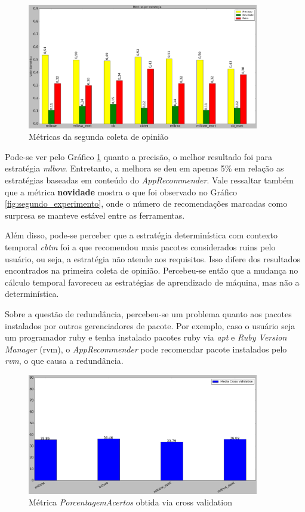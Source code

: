 \begin{figure}[h]
  \centering
  \includegraphics[width=0.9\textwidth]{figuras/metricas_segundo_experimento.eps}
  \caption{Métricas da segunda coleta de opinião}
  \label{fig:metricas_segundo_experimento}
\end{figure}

Pode-se ver pelo Gráfico \ref{fig:metricas_segundo_experimento} quanto a
precisão, o melhor resultado foi para estratégia \textit{mlbow}. Entretanto, a
melhora se deu em apenas 5\% em relação as estratégias baseadas em conteúdo do
\textit{AppRecommender}. Vale ressaltar também que a métrica \textbf{novidade}
mostra o que foi observado no Gráfico \ref{fig:segundo_experimento}, onde o
número de recomendações marcadas como surpresa se manteve estável entre as
ferramentas.

Além disso, pode-se perceber que a estratégia determinística com contexto
temporal \textit{cbtm} foi a que recomendou mais pacotes considerados ruins
pelo usuário, ou seja, a estratégia não atende aos requisitos. Isso difere dos
resultados encontrados na primeira coleta de opinião. Percebeu-se então que a mudança
no cálculo temporal favoreceu as estratégias de aprendizado de máquina, mas não
a determinística.

Sobre a questão de redundância, percebeu-se um problema quanto aos pacotes
instalados por outros gerenciadores de pacote. Por exemplo, caso o usuário seja
um programador ruby e tenha instalado pacotes ruby via \textit{apt} e
\textit{Ruby Version Manager} (rvm), o \textit{AppRecommender} pode recomendar
pacote instalados pelo \textit{rvm}, o que causa a redundância.

\begin{figure}[h]
  \centering
  \includegraphics[width=0.9\textwidth]{figuras/segundo_experimento_cross_validation.eps}
    \caption{Métrica \textit{PorcentagemAcertos} obtida via cross validation}
  \label{fig:segundo_experimento_cross_validation}
\end{figure}

